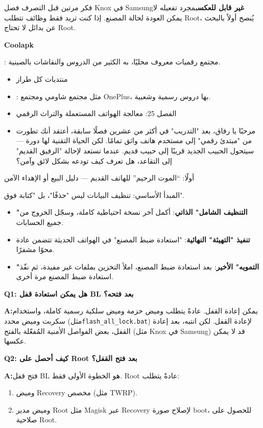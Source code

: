 \begin{tcbwarn}{فكر مرتين قبل التصرف}
فصل Knox في Samsung\textbf{غير قابل للعكس}بمجرد تفعيله لا يمكن العودة لحالة المصنع. إذا كنت تريد فقط وظائف تتطلب Root، يُنصح أولاً بالبحث عن بدائل لا تحتاج Root.

\end{tcbwarn}

\textbf{Coolapk}\par

: مجتمع رقميات معروف محليًا، به الكثير من الدروس والنقاشات بالصينية.

\begin{itemize}
  \item منتديات كل طراز
  \item : مثل مجتمع شاومي ومجتمع OnePlus، بها دروس رسمية وشعبية.
  \item الفصل 25: معالجة الهواتف المستعملة والتراث الرقمي
  \item مرحبًا يا رفاق، بعد "التدريب" في أكثر من عشرين فصلًا سابقة، أعتقد أنك تطورت من "مبتدئ رقمي" إلى مستخدم هاتف واثق تمامًا. لكن الحياة التقنية لها دورة — سيتحول الحبيب الجديد قريبًا إلى حبيب قديم. عندما تستعد لإحالة "الرفيق القديم" إلى التقاعد، هل تعرف كيف تودعه بشكل لائق وآمن؟
\end{itemize}

أولًا: “الموت الرحيم” للهاتف القديم — دليل البيع أو الإهداء الآمن

\begin{tcbinfo}{المبدأ الأساسي: تنظيف البيانات ليس "حذفًا"، بل "كتابة فوق".}
\begin{itemize}
  \item \textbf{"التنظيف الشامل" الذاتي}: أكمل آخر نسخة احتياطية كاملة، وسجّل الخروج من جميع الحسابات.
  \item \textbf{تنفيذ "التهيئة" النهائية}: "استعادة ضبط المصنع" في الهواتف الحديثة تتضمن عادة محوًا مشفرًا.
  \item \textbf{"التمويه" الأخير}: بعد استعادة ضبط المصنع، املأ التخزين بملفات غير مفيدة، ثم نفّذ استعادة ضبط المصنع مرة أخرى.
\end{itemize}

\end{tcbinfo}


\textbf{Q1: هل يمكن استعادة قفل BL بعد فتحه؟}\par

\textbf{A:}يمكن إعادة القفل. عادةً يتطلب وميض حزمة وميض سلكية رسمية كاملة، واستخدام سكربت وميض محدد (مثل\texttt{flash\_all\_lock.\allowbreak bat}) لإعادة القفل. لكن انتبه، بعد إعادة القفل، بعض الفواصل الأمنية المُفعّلة بالفتح (مثل Knox في Samsung) قد لا يمكن عكسها.

\textbf{Q2: كيف أحصل على Root بعد فتح القفل؟}\par

\textbf{A:}فتح قفل BL هو الخطوة الأولى فقط. Root عادةً يتطلب:

\begin{enumerate}
  \item وميض Recovery مخصص (مثل TWRP).
  \item وميض مدير Root مثل Magisk عبر Recovery لإصلاح صورة boot، للحصول على صلاحية Root.
\end{enumerate}
